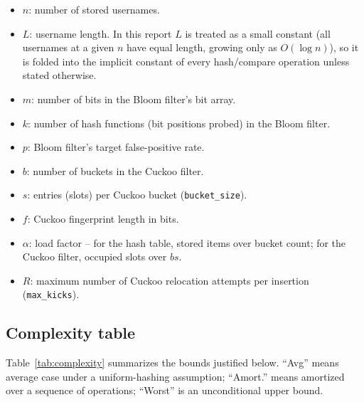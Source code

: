 \documentclass[acmsmall,screen,nonacm=true]{acmart}
\begin{document}
\begin{itemize}
  \item $n$: number of stored usernames.
  \item $L$: username length. In this report $L$ is treated as a small
    constant (all usernames at a given $n$ have equal length, growing only as
    $O(\log n)$), so it is folded into the implicit constant of every
    hash/compare operation unless stated otherwise.
  \item $m$: number of bits in the Bloom filter's bit array.
  \item $k$: number of hash functions (bit positions probed) in the Bloom
    filter.
  \item $p$: Bloom filter's target false-positive rate.
  \item $b$: number of buckets in the Cuckoo filter.
  \item $s$: entries (slots) per Cuckoo bucket (\texttt{bucket\_size}).
  \item $f$: Cuckoo fingerprint length in bits.
  \item $\alpha$: load factor -- for the hash table, stored items over
    bucket count; for the Cuckoo filter, occupied slots over $bs$.
  \item $R$: maximum number of Cuckoo relocation attempts per insertion
    (\texttt{max\_kicks}).
\end{itemize}

\subsection{Complexity table}

Table~\ref{tab:complexity} summarizes the bounds justified below. ``Avg''
means average case under a uniform-hashing assumption; ``Amort.'' means
amortized over a sequence of operations; ``Worst'' is an unconditional
upper bound.
\end{document}
